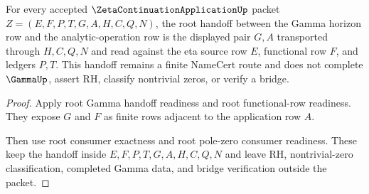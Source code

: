 \begin{theorem}
\label{thm:zeta-continuation-application-root-gamma-operation-handoff}
For every accepted $\ZetaContinuationApplicationUp$ packet
$Z=(E,F,P,T,G,A,H,C,Q,N)$, the root handoff between the Gamma horizon row and
the analytic-operation row is the displayed pair $G,A$ transported through
$H,C,Q,N$ and read against the eta source row $E$, functional row $F$, and
ledgers $P,T$. This handoff remains a finite NameCert route and does not
complete $\GammaUp$, assert RH, classify nontrivial zeros, or verify a bridge.
\end{theorem}
\begin{proof}
Apply root Gamma handoff readiness and root functional-row readiness. They
expose $G$ and $F$ as finite rows adjacent to the application row $A$.

Then use root consumer exactness and root pole-zero consumer readiness. These
keep the handoff inside $E,F,P,T,G,A,H,C,Q,N$ and leave RH, nontrivial-zero
classification, completed Gamma data, and bridge verification outside the
packet.
\end{proof}


